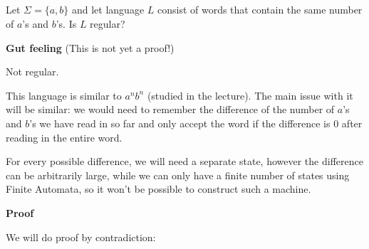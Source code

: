 \subsection{}
\label{3.1}


Let $\Sigma = \{a,b\}$ and let language $L$ consist of words
that contain the same number of $a$'s and $b$'s. Is $L$ regular?


\textbf{Gut feeling} (This is not yet a proof!)

Not regular.

This language is similar to $a^nb^n$ (studied in the lecture). The
main issue with it will be similar: we would need to remember the difference
of the number of $a$'s and $b$'s we have read in so far and only
accept the word if the difference is $0$ after reading in the entire
word.

For every possible difference, we will need a separate state, however the
difference can be arbitrarily large, while we can only have a finite
number of states using Finite Automata, so it won't be possible
to construct such a machine.

\textbf{Proof}

We will do proof by contradiction:

